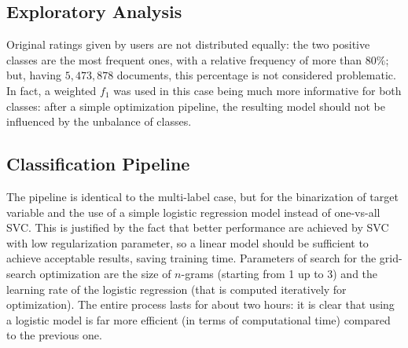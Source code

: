 \documentclass[fleqn,10pt]{SelfArx}
\begin{document}
\subsection{Exploratory Analysis}
Original ratings given by users are not distributed equally: the two positive classes are the most frequent ones, with a relative frequency of more than $80\%$; but, having $5,473,878$ documents, this percentage is not considered problematic.
In fact, a weighted $f_1$ was used in this case being much more informative for both classes: after a simple optimization pipeline, the resulting model should not be influenced by the unbalance of classes.

\subsection{Classification Pipeline}
The pipeline is identical to the multi-label case, but for the binarization of target variable and the use of a simple logistic regression model instead of one-vs-all SVC.
This is justified by the fact that better performance are achieved by SVC with low regularization parameter, so a linear model should be sufficient to achieve acceptable results, saving training time.
Parameters of search for the grid-search optimization are the size of $n$-grams (starting from 1 up to 3) and the learning rate of the logistic regression (that is computed iteratively for optimization).
The entire process lasts for about two hours: it is clear that using a logistic model is far more efficient (in terms of computational time) compared to the previous one.
\end{document}

